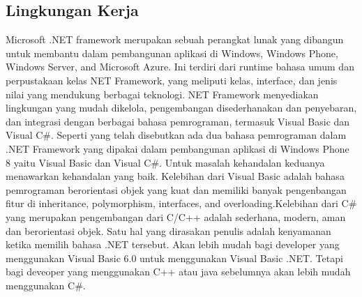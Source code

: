 \subsection{Lingkungan Kerja}
\label{subsec:Lingkungan Kerja}
\hspace{0.5cm} Microsoft .NET framework merupakan sebuah perangkat lunak yang dibangun untuk membantu dalam pembangunan aplikasi di Windows, Windows Phone, Windows Server, and Microsoft Azure\footnotemark[2]. Ini terdiri dari runtime bahasa umum dan perpustakaan kelas NET Framework, yang meliputi kelas, interface, dan jenis nilai yang mendukung berbagai teknologi. NET Framework menyediakan lingkungan yang mudah dikelola, pengembangan disederhanakan dan penyebaran, dan integrasi dengan berbagai bahasa pemrograman, termasuk Visual Basic dan Visual C\#.
\hspace{0.5cm} Seperti yang telah disebutkan ada dua bahasa pemrograman dalam .NET Framework yang dipakai dalam pembangunan aplikasi di Windows Phone 8 yaitu Visual Basic dan Visual C\#. Untuk masalah kehandalan keduanya menawarkan kehandalan yang baik. Kelebihan dari Visual Basic adalah bahasa pemrograman berorientasi objek yang kuat dan memiliki banyak pengenbangan fitur di inheritance, polymorphism, interfaces, and overloading\footnotemark[3].Kelebihan dari C\# yang merupakan pengembangan dari C/C++ adalah sederhana, modern, aman dan berorientasi objek\footnotemark[4]. Satu hal yang dirasakan penulis adalah kenyamanan ketika memilih bahasa .NET tersebut. Akan lebih mudah bagi developer yang menggunakan Visual Basic 6.0  untuk menggunakan Visual Basic .NET. Tetapi bagi  deveoper yang menggunakan C++ atau java sebelumnya akan lebih mudah menggunakan C\#.

